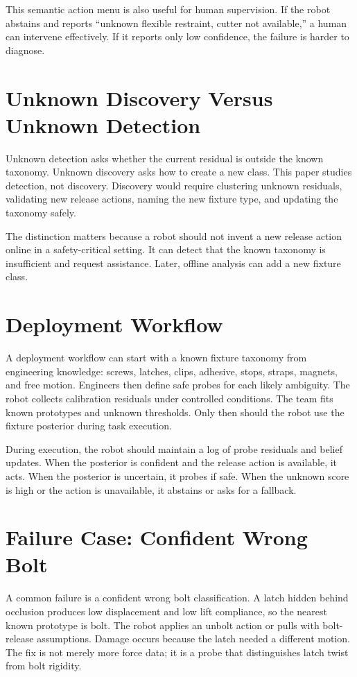 \documentclass{article}
\begin{document}
This semantic action menu is also useful for human supervision. If the robot
abstains and reports ``unknown flexible restraint, cutter not available,'' a
human can intervene effectively. If it reports only low confidence, the
failure is harder to diagnose.

\section{Unknown Discovery Versus Unknown Detection}

Unknown detection asks whether the current residual is outside the known
taxonomy. Unknown discovery asks how to create a new class. This paper studies
detection, not discovery. Discovery would require clustering unknown residuals,
validating new release actions, naming the new fixture type, and updating the
taxonomy safely.

The distinction matters because a robot should not invent a new release action
online in a safety-critical setting. It can detect that the known taxonomy is
insufficient and request assistance. Later, offline analysis can add a new
fixture class.

\section{Deployment Workflow}

A deployment workflow can start with a known fixture taxonomy from engineering
knowledge: screws, latches, clips, adhesive, stops, straps, magnets, and free
motion. Engineers then define safe probes for each likely ambiguity. The robot
collects calibration residuals under controlled conditions. The team fits
known prototypes and unknown thresholds. Only then should the robot use the
fixture posterior during task execution.

During execution, the robot should maintain a log of probe residuals and belief
updates. When the posterior is confident and the release action is available,
it acts. When the posterior is uncertain, it probes if safe. When the unknown
score is high or the action is unavailable, it abstains or asks for a fallback.

\section{Failure Case: Confident Wrong Bolt}

A common failure is a confident wrong bolt classification. A latch hidden
behind occlusion produces low displacement and low lift compliance, so the
nearest known prototype is bolt. The robot applies an unbolt action or pulls
with bolt-release assumptions. Damage occurs because the latch needed a
different motion. The fix is not merely more force data; it is a probe that
distinguishes latch twist from bolt rigidity.
\end{document}

